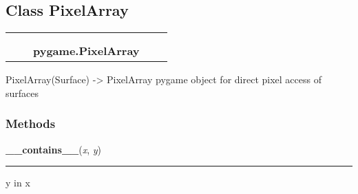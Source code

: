 

\subsection{Class PixelArray}

    \label{pygame:PixelArray}
\begin{tabular}{cccccc}
\multicolumn{2}{r}{\settowidth{\BCL}{object}\multirow{2}{\BCL}{object}}
&&
  \\\cline{3-3}
  &&\multicolumn{1}{c|}{}
&&
  \\
&&\multicolumn{2}{l}{\textbf{pygame.PixelArray}}
\end{tabular}

PixelArray(Surface) -{\textgreater} PixelArray pygame object for direct 
pixel access of surfaces



  \subsubsection{Methods}

    \label{pygame:PixelArray:__contains__}

    \vspace{0.5ex}

\hspace{.8\funcindent}\begin{boxedminipage}{\funcwidth}

    \raggedright \textbf{\_\_contains\_\_}(\textit{x}, \textit{y})

    \vspace{-1.5ex}

    \rule{\textwidth}{0.5\fboxrule}
\setlength{\parskip}{2ex}
    y in x

\setlength{\parskip}{1ex}
    \end{boxedminipage}

